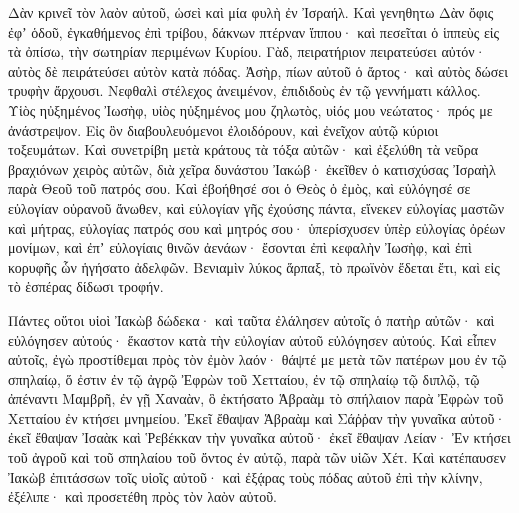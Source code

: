 {Δὰν κρινεῖ τὸν λαὸν αὐτοῦ, ὡσεὶ καὶ μία φυλὴ ἐν Ἰσραήλ.
Καὶ γενηθητω Δὰν ὄφις ἐφʼ ὁδοῦ, ἐγκαθήμενος ἐπὶ τρίβου, δάκνων πτέρναν ἵππου· καὶ πεσεῖται ὁ ἱππεὺς εἰς τὰ ὀπίσω,
τὴν σωτηρίαν περιμένων Κυρίου.
Γὰδ, πειρατήριον πειρατεύσει αὐτόν· αὐτὸς δὲ πειράτεύσει αὐτὸν κατὰ πόδας.
Ἀσὴρ, πίων αὐτοῦ ὁ ἄρτος· καὶ αὐτὸς δώσει τρυφὴν ἄρχουσι.
Νεφθαλὶ στέλεχος ἀνειμένον, ἐπιδιδοὺς ἐν τῷ γεννήματι κάλλος.
Υἱὸς ηὐξημένος Ἰωσὴφ, υἱὸς ηὐξημένος μου ζηλωτὸς, υἱός μου νεώτατος· πρός με ἀνάστρεψον.
Εἰς ὃν διαβουλευόμενοι ἐλοιδόρουν, καὶ ἐνεῖχον αὐτῷ κύριοι τοξευμάτων.
Καὶ συνετρίβη μετὰ κράτους τὰ τόξα αὐτῶν· καὶ ἐξελύθη τὰ νεῦρα βραχιόνων χειρὸς αὐτῶν, διὰ χεῖρα δυνάστου Ἰακώβ· ἐκεῖθεν ὁ κατισχύσας Ἰσραὴλ παρὰ Θεοῦ τοῦ πατρός σου.
Καὶ ἐβοήθησέ σοι ὁ Θεὸς ὁ ἐμὸς, καὶ εὐλόγησέ σε εὐλογίαν οὐρανοῦ ἄνωθεν, καὶ εὐλογίαν γῆς ἐχούσης πάντα, εἵνεκεν εὐλογίας μαστῶν καὶ μήτρας,
εὐλογίας πατρός σου καὶ μητρός σου· ὑπερίσχυσεν ὑπὲρ εὐλογίας ὀρέων μονίμων, καὶ ἐπʼ εὐλογίαις θινῶν ἀενάων· ἔσονται ἐπὶ κεφαλὴν Ἰωσὴφ, καὶ ἐπὶ κορυφῆς ὧν ἡγήσατο ἀδελφῶν.
Βενιαμὶν λύκος ἅρπαξ, τὸ πρωϊνὸν ἔδεται ἔτι, καὶ εἰς τὸ ἑσπέρας δίδωσι τροφήν.
\par }{\MM {}Πάντες οὕτοι υἱοὶ Ἰακὼβ δώδεκα· καὶ ταῦτα ἐλάλησεν αὐτοῖς ὁ πατὴρ αὐτῶν· καὶ εὐλόγησεν αὐτούς· ἕκαστον κατὰ τὴν εὐλογίαν αὐτοῦ εὐλόγησεν αὐτούς.
Καὶ εἶπεν αὐτοῖς, ἐγὼ προστίθεμαι πρὸς τὸν ἐμὸν λαόν· θάψτέ με μετὰ τῶν πατέρων μου ἐν τῷ σπηλαίῳ, ὅ ἐστιν ἐν τῷ ἀγρῷ Ἐφρὼν τοῦ Χετταίου,
ἐν τῷ σπηλαίῳ τῷ διπλῷ, τῷ ἀπέναντι Μαμβρῆ, ἐν γῇ Χαναὰν, ὃ ἐκτήσατο Ἁβραὰμ τὸ σπήλαιον παρὰ Ἐφρὼν τοῦ Χετταίου ἐν κτήσει μνημείου.
Ἐκεῖ ἔθαψαν Ἁβραὰμ καὶ Σάῤῥαν τὴν γυναῖκα αὐτοῦ· ἐκεῖ ἔθαψαν Ἰσαὰκ καὶ Ῥεβέκκαν τὴν γυναῖκα αὐτοῦ· ἐκεῖ ἔθαψαν Λείαν·
Ἐν κτήσει τοῦ ἀγροῦ καὶ τοῦ σπηλαίου τοῦ ὄντος ἐν αὐτῷ, παρὰ τῶν υἱῶν Χέτ.
Καὶ κατέπαυσεν Ἰακὼβ ἐπιτάσσων τοῖς υἱοῖς αὐτοῦ· καὶ ἐξᾴρας τοὺς πόδας αὐτοῦ ἐπὶ τὴν κλίνην, ἐξέλιπε· καὶ προσετέθη πρὸς τὸν λαὸν αὐτοῦ.

}
